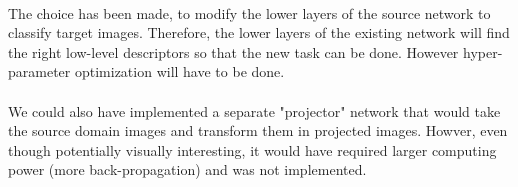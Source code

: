 \documentclass[11 pt]{article}
\begin{document}
\paragraph{} The choice has been made, to modify the lower layers of the source network to classify target images. Therefore, the lower layers of the existing network will find the right low-level descriptors so that the new task can be done. However hyper-parameter optimization will have to be done.

\paragraph{} We could also have implemented a separate "projector" network that would take the source domain images and transform them in projected images. Howver, even though potentially visually interesting, it would have required larger computing power (more back-propagation) and was not implemented.

\pagebreak
\end{document}
